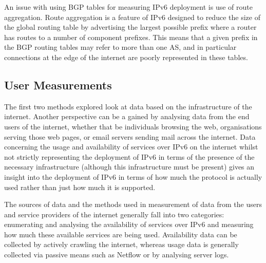 An issue with using BGP tables for measuring IPv6 deployment is use of route
aggregation. Route aggregation is a feature of IPv6 designed to reduce the size of the
global routing table by advertising the largest possible prefix where a router
has routes to a number of component prefixes. This means that a given prefix in
the BGP routing tables may refer to more than one AS, and in particular
connections at the edge of the internet are poorly represented in these
tables\cite{dhamdhere_measuring_2012}.


\subsection{User Measurements}

The first two methods explored look at data based on the
infrastructure of the internet. Another perspective can be a gained by analysing
data from the end users of the internet, whether that be individuals browsing
the web, organisations serving those web pages, or email servers sending mail
across the internet. Data concerning the usage and availability of services over
IPv6 on the internet whilst not strictly representing the deployment of IPv6 in
terms of the presence of the necessary infrastructure (although this
infrastructure must be
present) gives an insight into the deployment of IPv6 in terms of
how much the protocol is actually used rather than just how much it is supported.

The sources of data and the methods used in measurement of data from the users
and service providers of the internet generally fall into two categories:
enumerating and analysing the availability of services over IPv6 and measuring
how much these available services are being used. Availability data can be
collected by actively crawling the internet, whereas usage data is generally
collected via passive means such as Netflow\cite{shen_observations_2009} or by analysing server logs.

